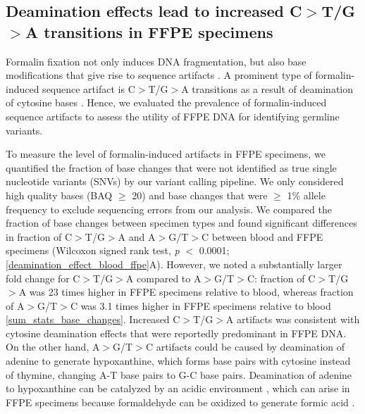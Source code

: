 \documentclass{bmcart}
\begin{document}
\subsection*{Deamination effects lead to increased C$>$T/G$>$A transitions in FFPE specimens}

Formalin fixation not only induces DNA fragmentation, but also base modifications that give rise to sequence artifacts \cite{Do2012, Do2013, Do2015a, Kim2017, Hofreiter2001, Wong2014, Ofner2017, Oh2015}. A prominent type of formalin-induced sequence artifact is C$>$T/G$>$A transitions as a result of deamination of cytosine bases \cite{Do2015a, Kim2017, Wong2014, Oh2015, Lin2014}. Hence, we evaluated the prevalence of formalin-induced sequence artifacts to assess the utility of FFPE DNA for identifying germline variants.

To measure the level of formalin-induced artifacts in FFPE specimens, we quantified the fraction of base changes that were not identified as true single nucleotide variants (SNVs) by our variant calling pipeline. We only considered high quality bases (BAQ $\geq$ 20) and base changes that were $\geq$ 1\% allele frequency to exclude sequencing errors from our analysis. We compared the fraction of base changes between specimen types and found significant differences in fraction of C$>$T/G$>$A and A$>$G/T$>$C between blood and FFPE specimens (Wilcoxon signed rank test, \textit{p} $<$ 0.0001; \autoref{deamination_effect_blood_ffpe}A). However, we noted a substantially larger fold change for C$>$T/G$>$A compared to A$>$G/T$>$C: fraction of C$>$T/G$>$A was 23 times higher in FFPE specimens relative to blood, whereas fraction of A$>$G/T$>$C was 3.1 times higher in FFPE specimens relative to blood \autoref{sum_stats_base_changes}. Increased C$>$T/G$>$A artifacts was consistent with cytosine deamination effects that were reportedly predominant in FFPE DNA. On the other hand, A$>$G/T$>$C artifacts could be caused by deamination of adenine to generate hypoxanthine, which forms base pairs with cytosine instead of thymine, changing A-T base pairs to G-C base pairs. Deamination of adenine to hypoxanthine can be catalyzed by an acidic environment \cite{Wang2010}, which can arise in FFPE specimens because formaldehyde can be oxidized to generate formic acid \cite{Do2015a}.
\end{document}
